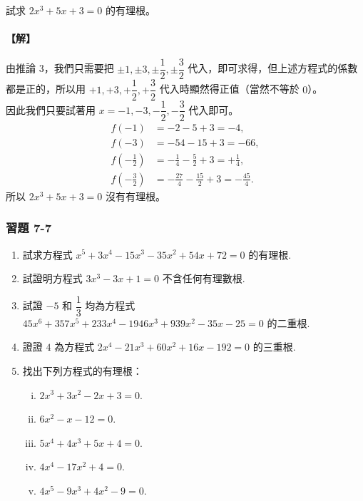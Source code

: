 \begin{example}\label{ex:7-2-17}
試求 $2x^3+5x+3 = 0$ 的有理根。

\paragraph{【解】}
由推論 3，我們只需要把 $\pm 1, \pm 3, \pm\dfrac{1}{2}, \pm\dfrac{3}{2}$ 代入，即可求得，但上述方程式的係數都是正的，所以用 $+1, +3, +\dfrac{1}{2}, +\dfrac{3}{2}$ 代入時顯然得正值（當然不等於 $0$）。\\
因此我們只要試著用 $x = -1, -3, -\dfrac{1}{2}, -\dfrac{3}{2}$ 代入即可。
\begin{align*}
  f(-1) &= -2-5+3 = -4, \\
  f(-3) &= -54-15+3 = -66, \\
  f\left(-\frac{1}{2}\right) &= -\frac{1}{4}-\frac{5}{2}+3 = +\frac{1}{4}, \\
  f\left(-\frac{3}{2}\right) &= -\frac{27}{4}-\frac{15}{2}+3 = -\frac{45}{4}.
\end{align*}
所以 $2x^3+5x+3 = 0$ 沒有有理根。
\end{example}

\subsubsection*{習題 7-7}\label{sec:ex7-7}

\begin{enumerate}[1.]
  \item 試求方程式 $x^5+3x^4-15x^3-35x^2+54x+72 = 0$ 的有理根.

  \item 試證明方程式 $3x^3-3x+1 = 0$ 不含任何有理數根.

  \item 試證 $-5$ 和 $\dfrac{1}{3}$ 均為方程式 $45x^6+357x^5+233x^4-1946x^3+939x^2-35x-25 = 0$ 的二重根.

  \item 證證 $4$ 為方程式 $2x^4-21x^3+60x^2+16x-192 = 0$ 的三重根.

  \item 找出下列方程式的有理根：
  \begin{enumerate}[(i)]
    \item $2x^3+3x^2-2x+3 = 0$.
    \item $6x^2-x-12 = 0$.
    \item $5x^4+4x^3+5x+4 = 0$.
    \item $4x^4-17x^2+4 = 0$.
    \item $4x^5-9x^3+4x^2-9 = 0$.
  \end{enumerate}
\end{enumerate}

